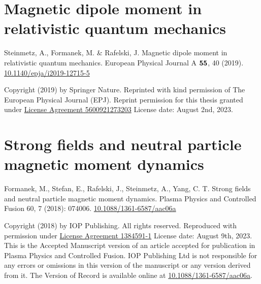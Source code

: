 \chapter{Magnetic dipole moment in relativistic quantum mechanics}
\label{appendixA}
\begin{center}
Steinmetz, A., Formanek, M. \& Rafelski, J. Magnetic dipole moment in relativistic quantum mechanics. European Physical Journal A $\boldsymbol{55}$, 40 (2019). \href{https://doi.org/10.1140/epja/i2019-12715-5}{10.1140/epja/i2019-12715-5}
\end{center}

\noindent Copyright (2019) by Springer Nature. Reprinted with kind permission of The European Physical Journal (EPJ). Reprint permission for this thesis granted under \href{https://s100.copyright.com/CustomerAdmin/PLF.jsp?ref=9a7a42d0-4511-4427-8acd-73a16083772c}{License Agreement 5600921273203} License date: August 2nd, 2023.

%

\chapter{Strong fields and neutral particle magnetic moment dynamics}
\label{appendixB}
\begin{center}
Formanek, M., Stefan, E., Rafelski, J., Steinmetz, A., Yang, C. T. Strong fields and neutral particle magnetic moment dynamics. Plasma Physics and Controlled Fusion 60, 7 (2018): 074006. \href{https://doi.org/10.1088/1361-6587/aac06a}{10.1088/1361-6587/aac06a}
\end{center}

\noindent Copyright (2018) by IOP Publishing. All rights reserved. Reproduced with permission under \href{https://marketplace.copyright.com/rs-ui-web/mp/license/56222509-d3e0-45fd-8ba6-f519e90d4d18/3a89c359-de4e-466f-93c3-ef1135413aab}{License Agreement 1384591-1} License date: August 9th, 2023. This is the Accepted Manuscript version of an article accepted for publication in Plasma Physics and Controlled Fusion. IOP Publishing Ltd is not responsible for any errors or omissions in this version of the manuscript or any version derived from it. The Version of Record is available online at \href{https://doi.org/10.1088/1361-6587/aac06a}{10.1088/1361-6587/aac06a}.

